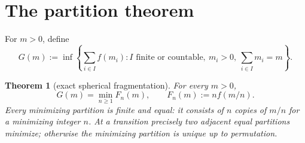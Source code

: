 \documentclass[11pt]{article}
\newtheorem{theorem}{Theorem}
\begin{document}
\clearpage
\section{The partition theorem}

For $m>0$, define
\[
 G(m):=\inf\left\{\sum_{i\in I}f(m_i):
 I\text{ finite or countable},\ m_i>0,\ \sum_{i\in I}m_i=m\right\}.
\]

\begin{theorem}[exact spherical fragmentation]\label{thm:partition}
For every $m>0$,
\begin{equation}\label{eq:partition}
 G(m)=\min_{n\ge1}F_n(m),\qquad
 F_n(m):=n f(m/n).
\end{equation}
Every minimizing partition is finite and equal: it consists of $n$ copies
of $m/n$ for a minimizing integer $n$.  At a transition precisely two
adjacent equal partitions minimize; otherwise the minimizing partition is
unique up to permutation.
\end{theorem}
\end{document}
